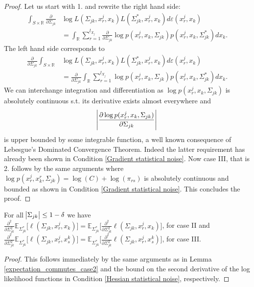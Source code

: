 \begin{lemma}
    \begin{proof}
        Let us start with 1. and rewrite the right hand side:
        \begin{align*}
            \int_{S\times \mathbb{R}} \frac{\partial }{\partial \Sigma_{jk}} &\log L(\Sigma_{jk}, x_r^j,x_k) L(\Sigma_{jk}^*, x_r^j,x_k) d\varepsilon(x_r^j,x_k) \\
            &= \int_\mathbb{R} \sum_{r=1}^{l_{X_j}} \frac{\partial }{\partial \Sigma_{jk}} \log p(x^j_{r},x_{k}, \Sigma_{jk}) p(x^j_{r},x_{k}, \Sigma^*_{jk}) dx_k.
        \end{align*}
        The left hand side corresponds to
        \begin{align*}
            \frac{\partial }{\partial \Sigma_{jk}} \int_{S\times \mathbb{R}} &\log L(\Sigma_{jk}, x_r^j,x_k) L(\Sigma_{jk}^*, x_r^j,x_k) d\varepsilon(x_r^j,x_k) \\
            &= \frac{\partial }{\partial \Sigma_{jk}} \int_\mathbb{R} \sum_{r=1}^{l_{X_j}} \log p(x^j_{r}, x_{k}, \Sigma_{jk}) p(x^j_{r},x_{k}, \Sigma_{jk}^*) dx_k.
        \end{align*}
        We can interchange integration and differentiation as $\log p(x^j_{r}, x_{k}, \Sigma_{jk})$ is absolutely continuous s.t. its derivative exists almost everywhere and 
        \begin{equation*}
            \abs{\frac{\partial \log p(x^j_{r}, x_{k}, \Sigma_{jk})}{\partial \Sigma_{jk}}}
        \end{equation*} is upper bounded by some integrable function, a well known consequence of Lebesgue's Dominated Convergence Theorem. Indeed the latter requirement has already been shown in Condition \ref{Gradient statistical noise}. Now case III, that is 2. follows by the same arguments where $\log p(x^j_{r}, x^r_{k}, \Sigma_{jk}) = \log(C) + \log(\pi_{rs})$ is absolutely continuous and bounded as shown in Condition \ref{Gradient statistical noise}. This concludes the proof.   
    \end{proof}
\end{lemma}


\begin{corollary}\label{expectation_commutes_case3}
    For all $\abs{\Sigma_{jk}} \leq 1-\delta$ we have \\
        $\frac{\partial^2 }{\partial \Sigma_{jk}^2} \mathbb{E}_{\Sigma_{jk}^*} \big[\ell(\Sigma_{jk}, x_r^j,x_k)\big] = \mathbb{E}_{\Sigma_{jk}^*} \Bigg[\frac{\partial^2 }{\partial \Sigma_{jk}^2} \ell(\Sigma_{jk}, x_r^j,x_k) \Bigg]$, for case II and \\
        $\frac{\partial^2 }{\partial \Sigma_{jk}^2} \mathbb{E}_{\Sigma_{jk}^*} \big[\ell(\Sigma_{jk}, x^j_r,x^k_s)\big] = \mathbb{E}_{\Sigma_{jk}^*} \Bigg[\frac{\partial^2 }{\partial \Sigma_{jk}^2} \ell(\Sigma_{jk}, x^j_r,x^k_s) \Bigg]$, for case III.
    
    \begin{proof}
        This follows immediately by the same arguments as in Lemma \ref{expectation_commutes_case2} and the bound on the second derivative of the log likelihood functions in Condition \ref{Hessian statistical noise}, respectively. 
    \end{proof}
\end{corollary}

